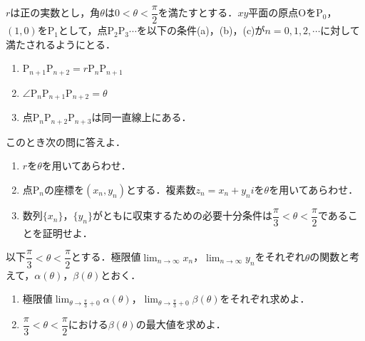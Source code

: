 \documentclass[../../main.tex]{subfiles}
\begin{document}
$r$は正の実数とし，角$\theta$は$0<\theta<\dfrac{\pi}{2}$を満たすとする．$xy$平面の原点$\mathrm{O}$を$\mathrm{P}_0$，$(1,0)$を$\mathrm{P}_1$として，点$\mathrm{P}_2\mathrm{P}_3\cdots$を以下の条件(a)，(b)，(c)が$n=0,1,2,\cdots$に対して満たされるようにとる．
\begin{enumerate}
  \item $\mathrm{P}_{n+1}\mathrm{P}_{n+2}=r\mathrm{P}_{n}\mathrm{P}_{n+1}$
  \item $\angle \mathrm{P}_{n}\mathrm{P}_{n+1}\mathrm{P}_{n+2}=\theta$
  \item 点$\mathrm{P}_n\mathrm{P}_{n+2}\mathrm{P}_{n+3}$は同一直線上にある．
\end{enumerate}
このとき次の問に答えよ．
\begin{enumerate}
  \item $r$を$\theta$を用いてあらわせ．
  \item 点$\mathrm{P}_n$の座標を$(x_n,y_n)$とする．複素数$z_n=x_n+y_ni$を$\theta$を用いてあらわせ．
  \item 数列$\{x_n\}$，$\{y_n\}$がともに収束するための必要十分条件は$\dfrac{\pi}{3}<\theta<\dfrac{\pi}{2}$であることを証明せよ．
\end{enumerate}
以下$\dfrac{\pi}{3}<\theta<\dfrac{\pi}{2}$とする．極限値$\lim_{n\to\infty}x_n$，$\lim_{n\to\infty}y_n$をそれぞれ$\theta$の関数と考えて，$\alpha(\theta)$，$\beta(\theta)$とおく．
\begin{enumerate}
  \item 極限値$\lim_{\theta\to{\frac{\pi}{3}+0}}\alpha(\theta)$，$\lim_{\theta\to{\frac{\pi}{3}+0}}\beta(\theta)$をそれぞれ求めよ．
  \item $\dfrac{\pi}{3}<\theta<\dfrac{\pi}{2}$における$\beta(\theta)$の最大値を求めよ．
\end{enumerate}
\end{document}
